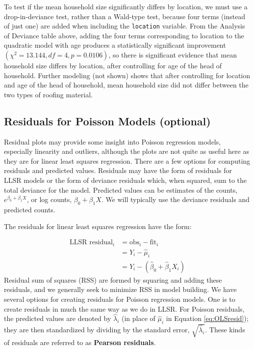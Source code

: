 \documentclass[
]{krantz}
\begin{document}
To test if the mean household size significantly differs by location, we must use a drop-in-deviance test, rather than a Wald-type test, because four terms (instead of just one) are added when including the \texttt{location} variable. From the Analysis of Deviance table above, adding the four terms corresponding to location to the quadratic model with age produces a statistically significant improvement \((\chi^2=13.144, df = 4, p=0.0106)\), so there is significant evidence that mean household size differs by location, after controlling for age of the head of household. Further modeling (not shown) shows that after controlling for location and age of the head of household, mean household size did not differ between the two types of roofing material.

\subsection{Residuals for Poisson Models (optional)}\label{sec-PoisResid}

Residual plots may provide some insight into Poisson regression models, especially linearity and outliers, although the plots are not quite as useful here as they are for linear least squares regression. There are a few options for computing residuals and predicted values. Residuals may have the form of residuals for LLSR models or the form of deviance residuals which, when squared, sum to the total deviance for the model. Predicted values can be estimates of the counts, \(e^{\beta_0+\beta_1X}\), or log counts, \(\beta_0+\beta_1X\). We will typically use the deviance residuals and predicted counts.

The residuals for linear least squares regression have the form:

\begin{align}
 \textrm{LLSR residual}_i  &= \textrm{obs}_i - \textrm{fit}_i \nonumber \\
&={Y_i-\hat{\mu}_i} \nonumber \\
 &= Y_i-(\hat{\beta}_0 +\hat{\beta}_1 X_i)
\label{eq:OLSresid}
 \end{align}
Residual sum of squares (RSS) are formed by squaring and adding these residuals, and we generally seek to minimize RSS in model building. We have several options for creating residuals for Poisson regression models. One is to create residuals in much the same way as we do in LLSR. For Poisson residuals, the predicted values are denoted by \(\hat{\lambda}_i\) (in place of \(\hat{\mu}_i\) in Equation \eqref{eq:OLSresid}); they are then standardized by dividing by the standard error, \(\sqrt{\hat{\lambda}_i}\). These kinds of residuals are referred to as \textbf{Pearson residuals}. 
\end{document}
